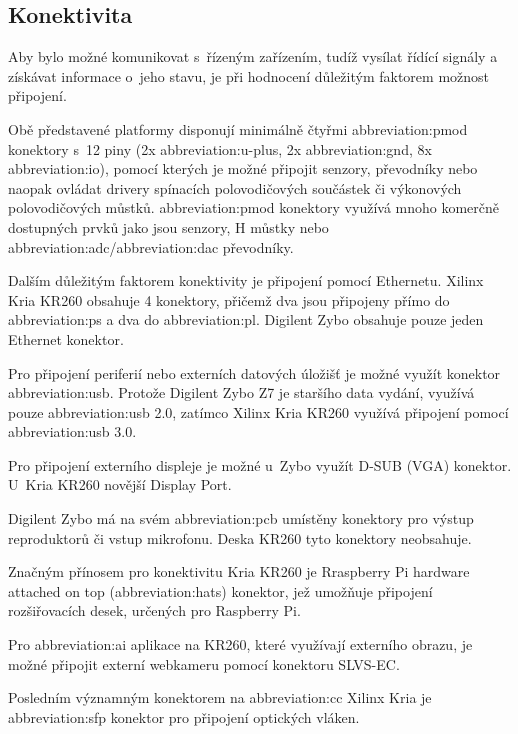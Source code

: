 \documentclass[a4paper, twoside, 11pt]{article}
\begin{document}
			\subsection{Konektivita}
					Aby bylo možné komunikovat s~řízeným zařízením, tudíž vysílat řídící signály a získávat informace o~jeho stavu, je při hodnocení důležitým faktorem možnost připojení.\par
					Obě představené platformy disponují minimálně čtyřmi \gls{abbreviation:pmod} konektory s~12 piny (2x \gls{abbreviation:u-plus}, 2x \gls{abbreviation:gnd}, 8x \gls{abbreviation:io}), pomocí kterých je možné připojit senzory, převodníky nebo naopak ovládat drivery spínacích polovodičových součástek či výkonových polovodičových můstků. \gls{abbreviation:pmod} konektory využívá mnoho komerčně dostupných prvků jako jsou senzory, H můstky nebo \gls{abbreviation:adc}/\gls{abbreviation:dac} převodníky.\par
					Dalším důležitým faktorem konektivity je připojení pomocí Ethernetu. Xilinx Kria KR260 obsahuje 4 konektory, přičemž dva jsou připojeny přímo do \gls{abbreviation:ps} a dva do \gls{abbreviation:pl}. Digilent Zybo obsahuje pouze jeden Ethernet konektor.\par
					Pro připojení periferií nebo externích datových úložišť je možné využít konektor \gls{abbreviation:usb}. Protože Digilent Zybo Z7 je staršího data vydání, využívá pouze \gls{abbreviation:usb} 2.0, zatímco Xilinx Kria KR260 využívá připojení pomocí \gls{abbreviation:usb} 3.0.\par
					Pro připojení externího displeje je možné u~Zybo využít D-SUB (VGA) konektor. U~Kria KR260 novější Display Port.\par
					Digilent Zybo má na svém \gls{abbreviation:pcb} umístěny konektory pro výstup reproduktorů či vstup mikrofonu. Deska KR260 tyto konektory neobsahuje.\par
					Značným přínosem pro konektivitu Kria KR260 je Rraspberry Pi hardware attached on top (\gls{abbreviation:hats}) konektor, jež umožňuje připojení rozšiřovacích desek, určených pro Raspberry Pi.\par
					Pro \gls{abbreviation:ai} aplikace na KR260, které využívají externího obrazu, je možné připojit externí webkameru pomocí konektoru SLVS-EC.\par
					Posledním významným konektorem na \gls{abbreviation:cc} Xilinx Kria je \gls{abbreviation:sfp} konektor pro připojení optických vláken.
\end{document}
